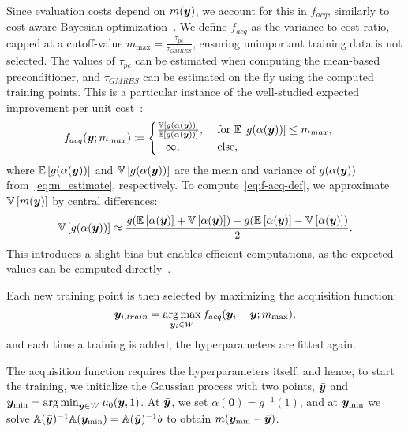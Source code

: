 Since evaluation costs depend on $m({\bm{y}})$, we account for this in $f_{acq}$, similarly to cost-aware Bayesian optimization~\cite{luong2021,xie2024}.
We define $f_{acq}$ as the variance-to-cost ratio, capped at a cutoff-value $m_{\max}=\frac{\tau_{pc}}{\tau_{GMRES}}$, ensuring unimportant training data is not selected.
The values of $\tau_{pc}$ can be estimated when computing the mean-based preconditioner, and $\tau_{GMRES}$ can be estimated on the fly using the computed training points.
This is a particular instance of the well-studied expected improvement per unit cost~\cite{snoek2012}:
\begin{equation}
    f_{acq}({\bm{y}}; m_{max})\coloneqq
    \begin{cases}
        \frac{\mathbb{V}\left[ g(\alpha({\bm{y}})) \right]}{\mathbb{E}\left[ g(\alpha({\bm{y}})) \right]}, &\text{ for } \mathbb{E}\left[ g(\alpha({\bm{y}})) \right] \leq m_{max},\\
        -\infty, &\text{ else},
    \end{cases}\,\,\,\,\,\,\,
    \label{eq:f-acq-def}
\end{equation}
where $\mathbb{E}\left[ g(\alpha({\bm{y}})) \right]$ and $\mathbb{V}\left[ g(\alpha({\bm{y}})) \right]$ are the mean and variance of $g(\alpha({\bm{y}}))$ from~\eqref{eq:m_estimate}, respectively.
To compute~\eqref{eq:f-acq-def}, we approximate $\mathbb{V}\left[ m({\bm{y}}) \right]$ by central differences:
\begin{equation*}
    \mathbb{V}\left[ g(\alpha({\bm{y}})) \right] \approx \frac{g(\mathbb{E}\left[ \alpha({\bm{y}}) \right] + \mathbb{V}\left[ \alpha({\bm{y}}) \right])-g(\mathbb{E}\left[ \alpha({\bm{y}}) \right] - \mathbb{V}\left[ \alpha({\bm{y}}) \right])}{2}.
\end{equation*}
This introduces a slight bias but enables efficient computations, as the expected values can be computed directly~\cite[Chapter~6]{bishop2006}.

Each new training point is then selected by maximizing the acquisition function:
\begin{equation*}
    {\bm{y}}_{i,train} = \operatorname*{arg\,max}_{{\bm{y}}_i\in W} f_{acq}({\bm{y}}_i-\bar{{\bm{y}}};m_{\max}),
\end{equation*}
and each time a training is added, the hyperparameters are fitted again.

The acquisition function requires the hyperparameters itself, and hence, to start the training, we initialize the Gaussian process with two points, $\bar{{\bm{y}}}$ and ${\bm{y}}_{\min}=\operatorname*{arg\,min}_{{\bm{y}}\in W} \mu_0({\bm{y}}, 1)$.
At $\bar{{\bm{y}}}$, we set $\alpha(\bm{0})=g^{-1}(1)$, and at ${\bm{y}}_{\min}$ we solve $\mathbb{A}(\bar{{\bm{y}}})^{-1}\mathbb{A}({\bm{y}}_{\min})=\mathbb{A}(\bar{{\bm{y}}})^{-1}b$ to obtain $m({{\bm{y}}_{\min}}-\bar{\bm{y}})$.

